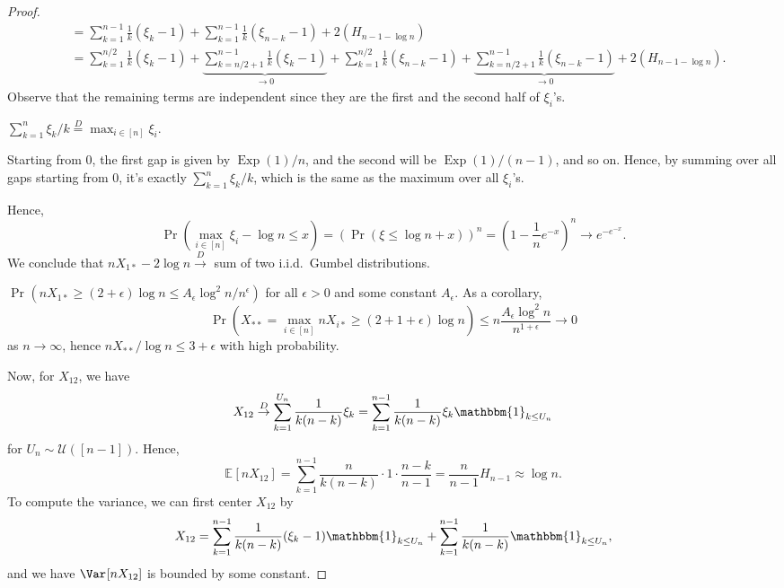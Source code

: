 \begin{proof}
\[\begin{split}
			 & = \sum_{k=1}^{n-1} \frac{1}{k} (\xi _k - 1) + \sum_{k=1}^{n-1} \frac{1}{k} (\xi _{n-k} - 1) + 2 (H_{n-1 - \log n})                                                                                                                                                               \\
			 & = \sum_{k=1}^{n / 2} \frac{1}{k} (\xi _k - 1) + \underbrace{\sum_{k=n / 2 + 1}^{n - 1} \frac{1}{k} (\xi _k - 1)}_{\to 0} + \sum_{k=1}^{n / 2} \frac{1}{k} (\xi _{n-k} - 1) + \underbrace{\sum_{k=n / 2 + 1}^{n-1} \frac{1}{k} (\xi _{n-k} - 1)}_{\to 0} + 2 (H_{n-1 - \log n}) .
		\end{split}
	\]
	Observe that the remaining terms are independent since they are the first and the second half of \(\xi _i\)'s.

	\begin{claim}
		\(\sum_{k=1}^{n} \xi _k / k \overset{D}{=} \max _{i \in [n]} \xi _i\).
	\end{claim}
	\begin{explanation}
		Starting from \(0\), the first gap is given by \(\operatorname{Exp}(1) / n\), and the second will be \(\operatorname{Exp}(1) / (n-1)\), and so on. Hence, by summing over all gaps starting from \(0\), it's exactly \(\sum_{k=1}^{n} \xi _k / k\), which is the same as the maximum over all \(\xi _i\)'s.
	\end{explanation}

	Hence,
	\[
		\Pr_{}\left(\max _{i \in [n]} \xi _i - \log n \leq x\right)
		= \left( \Pr_{}\left(\xi \leq \log n + x \right) \right) ^n
		= \left( 1 - \frac{1}{n} e^{-x} \right) ^n
		\to e^{-e^{-x}}.
	\]
	We conclude that \(n X_{1 \ast} - 2 \log n \overset{D}{\to} \) sum of two i.i.d.\ Gumbel distributions.

	\begin{exercise}
		\(\Pr_{}\left(n X_{1 \ast} \geq (2 + \epsilon ) \log n \leq A_{\epsilon } \log ^2 n / n^{\epsilon }\right) \) for all \(\epsilon > 0\) and some constant \(A_{\epsilon }\). As a corollary,
		\[
			\Pr_{}\left( X_{\ast\ast} = \max _{i \in [n]} n X_{i \ast} \geq (2 + 1 + \epsilon ) \log n\right)
			\leq n \frac{A_{\epsilon } \log ^2 n}{n^{1 + \epsilon }}
			\to 0
		\]
		as \(n \to \infty \), hence \(n X_{\ast\ast} / \log n \leq 3 + \epsilon \) with high probability.
	\end{exercise}

	Now, for \(X_{12}\), we have
	\[
		X_{12}
		\overset{D}{\to} \sum_{k=1}^{U_n} \frac{1}{k (n-k)} \xi _k
		= \sum_{k=1}^{n-1} \frac{1}{k (n-k)} \xi _k \mathbbm{1}_{k \leq U_n}
	\]
	for \(U_n \sim \mathcal{U} ([n-1])\). Hence,
	\[
		\mathbb{E}_{}[n X_{12}]
		= \sum_{k=1}^{n-1} \frac{n}{k (n-k)} \cdot 1 \cdot \frac{n-k}{n-1}
		= \frac{n}{n-1} H_{n-1}
		\approx \log n.
	\]
	To compute the variance, we can first center \(X_{12}\) by
	\[
		X_{12}
		= \sum_{k=1}^{n-1} \frac{1}{k (n-k)} (\xi _k - 1) \mathbbm{1}_{k \leq U_n} + \sum_{k=1}^{n-1} \frac{1}{k (n-k)} \mathbbm{1}_{k \leq U_n} ,
	\]
	and we have \(\Var_{}[n X_{12}] \) is bounded by some constant.


\end{proof}
